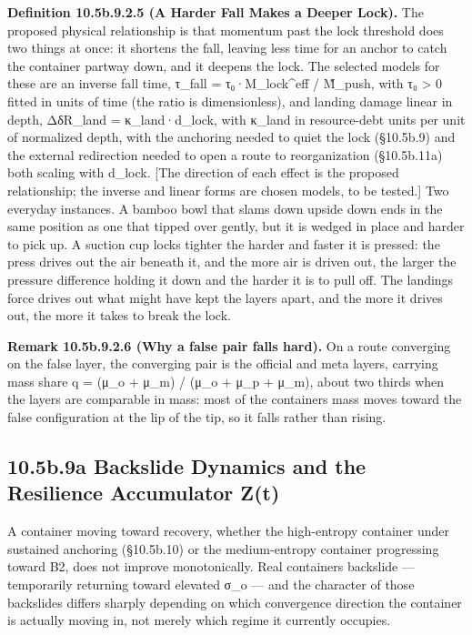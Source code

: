 \documentclass[
]{article}
\begin{document}
\textbf{Definition 10.5b.9.2.5 (A Harder Fall Makes a Deeper Lock).} The
proposed physical relationship is that momentum past the lock threshold
does two things at once: it shortens the fall, leaving less time for an
anchor to catch the container partway down, and it deepens the lock. The
selected models for these are an inverse fall time, τ\_fall =
τ₀·M\_lock\^{}eff / M̃\_push, with τ₀ \textgreater{} 0 fitted in units of
time (the ratio is dimensionless), and landing damage linear in depth,
ΔδR\_land = κ\_land·d\_lock, with κ\_land in resource-debt units per
unit of normalized depth, with the anchoring needed to quiet the lock
(§10.5b.9) and the external redirection needed to open a route to
reorganization (§10.5b.11a) both scaling with d\_lock. {[}The direction
of each effect is the proposed relationship; the inverse and linear
forms are chosen models, to be tested.{]} Two everyday instances. A
bamboo bowl that slams down upside down ends in the same position as one
that tipped over gently, but it is wedged in place and harder to pick
up. A suction cup locks tighter the harder and faster it is pressed: the
press drives out the air beneath it, and the more air is driven out, the
larger the pressure difference holding it down and the harder it is to
pull off. The landing\textquotesingle s force drives out what might have
kept the layers apart, and the more it drives out, the more it takes to
break the lock.

\textbf{Remark 10.5b.9.2.6 (Why a false pair falls hard).} On a route
converging on the false layer, the converging pair is the official and
meta layers, carrying mass share q = (μ\_o + μ\_m) / (μ\_o + μ\_p +
μ\_m), about two thirds when the layers are comparable in mass: most of
the container\textquotesingle s mass moves toward the false
configuration at the lip of the tip, so it falls rather than rising.

\hypertarget{b.9a-backslide-dynamics-and-the-resilience-accumulator-zt}{%
\subsection{10.5b.9a Backslide Dynamics and the Resilience Accumulator
Z(t)}\label{b.9a-backslide-dynamics-and-the-resilience-accumulator-zt}}

A container moving toward recovery, whether the high-entropy container
under sustained anchoring (§10.5b.10) or the medium-entropy container
progressing toward B2, does not improve monotonically. Real containers
backslide --- temporarily returning toward elevated σ\_o --- and the
character of those backslides differs sharply depending on which
convergence direction the container is actually moving in, not merely
which regime it currently occupies.
\end{document}
